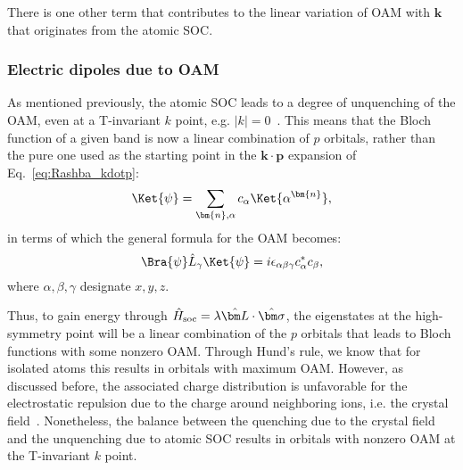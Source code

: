 There is one other term that contributes to the linear variation of \gls{OAM} with $\bm{k}$ that originates from the atomic \gls{SOC}.

\subsubsection{Electric dipoles due to \gls{OAM} \label{sec:Rashba_SOC_part}}
As mentioned previously, the atomic \gls{SOC} leads to a degree of unquenching of the \gls{OAM}, even at a \gls{T}-invariant $k$ point, e.g. $|k|=0$~\cite{Park2011,Park2012,Park2015}.
This means that the Bloch function of a given band is now a linear combination of $p$ orbitals, rather than the pure one used as the starting point in the $\bm k \cdot \bm p$ expansion of Eq.~\eqref{eq:Rashba_kdotp}:
\begin{equation}
\Ket{\psi} = \sum_{\bm{n},\alpha} c_\alpha \Ket{\alpha^{\bm{n}}},
\end{equation}
in terms of which the general formula for the \gls{OAM} becomes:
\begin{equation}
	\Bra{\psi}\hat L_{\gamma}\Ket{\psi}= i \epsilon_{\alpha \beta \gamma} c^*_\alpha c_\beta,
\end{equation}
where $\alpha,\beta,\gamma$ designate $x,y,z$.

Thus, to gain energy through $\hat H_{\rm soc} = \lambda \hat {\bm L}\cdot \hat{\bm \sigma}$, the eigenstates at the high-symmetry point will be a linear combination of the $p$ orbitals that leads to Bloch functions with some nonzero \gls{OAM}.
Through Hund's rule, we know that for isolated atoms this results in orbitals with maximum \gls{OAM}.
However, as discussed before, the associated charge distribution is unfavorable for the electrostatic repulsion due to the charge around neighboring ions, i.e. the crystal field~\cite{Ballhausen}.
Nonetheless, the balance between the quenching due to the crystal field and the unquenching due to atomic \gls{SOC} results in orbitals with nonzero \gls{OAM} at the \gls{T}-invariant $k$ point. 
    
